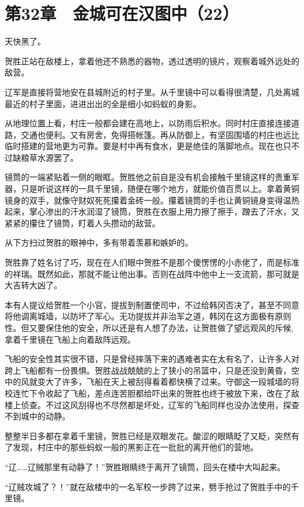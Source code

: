 \section{第32章　金城可在汉图中（22）}

天快黑了。

贺胜正站在敌楼上，拿着他还不熟悉的器物，透过透明的镜片，观察着城外远处的敌营。

辽军是直接将营地安在县城附近的村子里。从千里镜中可以看得很清楚，几处离城最近的村子里面，进进出出的全是细小如蚂蚁的身影。

从地理位置上看，村庄一般都会建在高地上，以防雨后积水。同时村庄直接连接道路，交通也便利。又有房舍，免得搭帐篷。再从防御上，有坚固围墙的村庄也远比临时搭建的营地更为可靠。要是村中再有食水，更是绝佳的落脚地点。现在也只不过缺粮草水源罢了。

镜筒的一端紧贴着一侧的眼眶。贺胜他之前自是没有机会接触千里镜这样的贵重军器，只是听说这样的一具千里镜，随便在哪个地方，就能价值百贯以上。拿着黄铜镜身的双手，就像守财奴死死攥着金砖一般。攥着镜筒的手也让黄铜镜身变得温热起来，掌心渗出的汗水润湿了镜筒，贺胜在衣服上用力擦了擦手，蹭去了汗水，又紧紧的攥住了镜筒，盯着人头攒动的敌营。

从下方扫过贺胜的眼神中，多有带着羡慕和嫉妒的。

贺胜靠了姓名讨了巧，现在在人们眼中贺胜不是那个傻愣愣的小赤佬了，而是标准的祥瑞。既然如此，那就不能让他出事。否则在战阵中他中上一支流箭，那可就是大吉转大凶了。

本有人提议给贺胜一个小官，提拔到制置使司中，不过给韩冈否决了，甚至不同意将他调离城墙，以防坏了军心。无功提拔并非治军之道，韩冈在这方面极有原则性。但又要保住他的安全，所以还是有人想了办法，让贺胜做了望远观风的斥候,拿着千里镜在飞船上向着敌阵远观。

飞船的安全性其实很不错，只是曾经摔落下来的遇难者实在太有名了，让许多人对跨上飞船都有一份畏惧。贺胜战战兢兢的上了狭小的吊篮中，只是还没到黄昏，空中的风就变大了许多，飞船在天上被刮得看着都快横了过来。守御这一段城墙的将校连忙下令收起了飞船，差点连苦胆都给吓出来的贺胜也终于被放下来，改在了敌楼上侦查。不过这风刮得也不尽然都是坏处，辽军的飞船同样也没办法使用，探查不到城中的动静。

整整半日多都在拿着千里镜，贺胜已经是双眼发花。酸涩的眼睛眨了又眨，突然有了发现，村庄中的那些蚂蚁一般的黑影正在一批批的离开他们的营地。

“辽……辽贼那里有动静了！”贺胜眼睛终于离开了镜筒，回头在楼中大叫起来。

“辽贼攻城了？！”就在敌楼中的一名军校一步跨了过来，劈手抢过了贺胜手中的千里镜。

